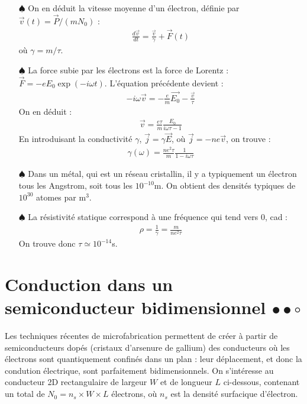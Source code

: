 \documentclass{report}
\begin{document}
\begin{itemize}
	\item[$\spadesuit$] On en déduit la vitesse moyenne d'un électron, définie par $\vec{v}(t)=\vec{P}/(mN_0)$ :
	\begin{align*}
		\frac{d\vec{v}}{dt}=\frac{\vec{v}}{\gamma}+\vec{F}(t)
	\end{align*}
	où $\gamma=m/\tau$.
	
	\item[$\spadesuit$] La force subie par les électrons est la force de Lorentz : $\vec{F}=-eE_0\exp(-i\omega t)$. L'équation précédente devient :
	\begin{align*}
		-i\omega\vec{v}=-\frac{e}{m}\vec{E_0}-\frac{\vec{v}}{\tau}
	\end{align*}
	On en déduit :
	\begin{align*}
		\vec{v}=\frac{e\tau}{m}\frac{E_0}{i\omega\tau-1}
	\end{align*}
	En introduisant la conductivité $\gamma$, $\vec{j}=\gamma \vec{E}$, où $\vec{j}=-ne\vec{v}$, on trouve :
	\begin{align*}
		\gamma(\omega)=\frac{ne^2\tau}{m}\frac{1}{1-i\omega\tau}
	\end{align*}
	
	\item[$\spadesuit$] Dans un métal, qui est un réseau cristallin, il y a typiquement un électron tous les Angstrom, soit tous les $10^{-10}$m. On obtient des densités typiques de $10^{30}$ atomes par m$^3$.
	
	\item[$\spadesuit$] La résistivité statique correspond à une fréquence qui tend vers 0, cad :
	\begin{align*}
		\rho = \frac{1}{\gamma}=\frac{m}{ne^2\tau}
	\end{align*}
	On trouve donc $\tau\simeq10^{-14}$s.
	
\end{itemize}

\newpage

\newpage

\section*{Conduction dans un semiconducteur bidimensionnel $\bullet\bullet\circ$}
 
Les techniques récentes de microfabrication permettent de créer à partir de semiconducteurs dopés (cristaux d'arsenure de gallium) des conducteurs où les électrons sont quantiquement confinés dans un plan : leur déplacement, et donc la condution électrique, sont parfaitement bidimensionnels. On s'intéresse au conducteur 2D rectangulaire de largeur $W$ et de longueur $L$ ci-dessous, contenant un total de $N_0=n_s\times W\times L$ électrons, où $n_s$ est la densité surfacique d'électron.
\end{document}
